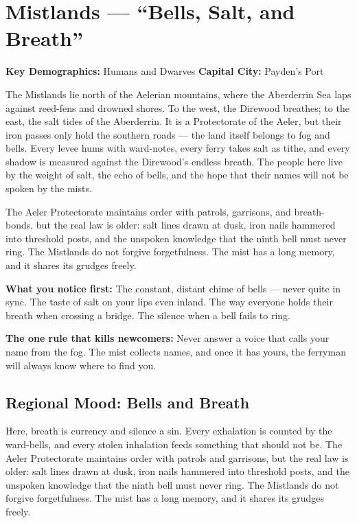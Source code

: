 \section{Mistlands --- ``Bells, Salt, and Breath''}
\label{chap:mistlands}

\textbf{Key Demographics: } Humans and Dwarves
\textbf{Capital City: } Payden's Port


\begin{tcolorbox}[colback=black!3,colframe=blue!60!black,title={Theme \& Atmosphere},breakable]
The Mistlands lie north of the Aelerian mountains, where the Aberderrin Sea laps against reed-fens and drowned shores. To the west, the Direwood breathes; to the east, the salt tides of the Aberderrin. It is a Protectorate of the Aeler, but their iron passes only hold the southern roads --- the land itself belongs to fog and bells. Every levee hums with ward-notes, every ferry takes salt as tithe, and every shadow is measured against the Direwood's endless breath. The people here live by the weight of salt, the echo of bells, and the hope that their names will not be spoken by the mists.

The Aeler Protectorate maintains order with patrols, garrisons, and breath-bonds, but the real law is older: salt lines drawn at dusk, iron nails hammered into threshold posts, and the unspoken knowledge that the ninth bell must never ring. The Mistlands do not forgive forgetfulness. The mist has a long memory, and it shares its grudges freely.

\vspace{2mm}
\textbf{What you notice first:} The constant, distant chime of bells --- never quite in sync. The taste of salt on your lips even inland. The way everyone holds their breath when crossing a bridge. The silence when a bell fails to ring.

\textbf{The one rule that kills newcomers:} Never answer a voice that calls your name from the fog. The mist collects names, and once it has yours, the ferryman will always know where to find you.
\end{tcolorbox}

\subsection*{Regional Mood: Bells and Breath}

Here, breath is currency and silence a sin. Every exhalation is counted by the ward-bells, and every stolen inhalation feeds something that should not be. The Aeler Protectorate maintains order with patrols and garrisons, but the real law is older: salt lines drawn at dusk, iron nails hammered into threshold posts, and the unspoken knowledge that the ninth bell must never ring. The Mistlands do not forgive forgetfulness. The mist has a long memory, and it shares its grudges freely.


